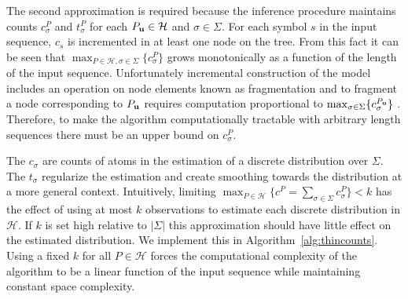 The second approximation is required because the inference procedure maintains counts $c^P_\sigma$ and $t^P_\sigma$ for each $P_{\bf u} \in \mathcal{H}$ and $\sigma \in \Sigma$.  For each symbol $s$ in the input sequence, $c_{s}$ is incremented in at least one node on the tree.  From this fact it can be seen that $\max_{P \in \mathcal{H}, \sigma \in \Sigma} \{ c^{P}_{\sigma} \}$ grows monotonically as a function of the length of the input sequence. Unfortunately incremental construction of the model includes an operation on node elements known as fragmentation \citep{Wood2009} and to fragment a node corresponding to $P_{\bf u}$ requires computation proportional to $\max_{\sigma \in \Sigma} \{ c_{\sigma}^{P_{\bf u}} \}$ \citep{Gasthaus2011}. Therefore, to make the algorithm computationally tractable with arbitrary length sequences there must be an upper bound on $c^P_\sigma$.  

The $c_{\sigma}$ are counts of atoms in the estimation of a discrete distribution over $\Sigma$.  The $t_{\sigma}$ regularize the estimation and create smoothing towards the distribution at a more general context.  Intuitively, limiting $\max_{P \in \mathcal{H}} \{ c^{P} =  \sum_{\sigma \in \Sigma} c^{P}_{\sigma} \} < k$  has the effect of using at most $k$ observations to estimate each discrete distribution in $\mathcal{H}$.  If $k$ is set high relative to $|\Sigma|$ this approximation should have little effect on the estimated distribution. We implement this in Algorithm~\ref{alg:thincounts}.  Using a fixed $k$ for all $P \in \mathcal{H}$ forces the computational complexity of the algorithm to be a linear function of the input sequence while maintaining constant space complexity.








